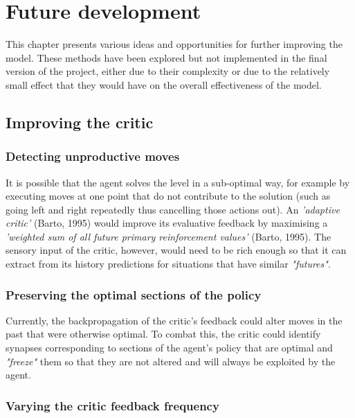 \documentclass[10pt]{article}
\begin{document}
    \section{Future development}

    This chapter presents various ideas and opportunities for further improving the model. These methods have been explored but not implemented in the final version of the project, either due to their complexity or due to the relatively small effect that they would have on the overall effectiveness of the model.

    \subsection{Improving the critic}

    \subsubsection{Detecting unproductive moves}

    It is possible that the agent solves the level in a sub-optimal way, for example by executing moves at one point that do not contribute to the solution (such as going left and right repeatedly thus cancelling those actions out). An \textit{'adaptive critic'} (Barto, 1995) would improve its evaluative feedback by maximising a \textit{'weighted sum of all future primary reinforcement values'} (Barto, 1995). The sensory input of the critic, however, would need to be rich enough so that it can extract from its history predictions for situations that have similar \textit{"futures"}.

    \subsubsection{Preserving the optimal sections of the policy}

    Currently, the backpropagation of the critic's feedback could alter moves in the past that were otherwise optimal. To combat this, the critic could identify synapses corresponding to sections of the agent's policy that are optimal and \textit{"freeze"} them so that they are not altered and will always be exploited by the agent.

    \subsubsection{Varying the critic feedback frequency}
\end{document}
